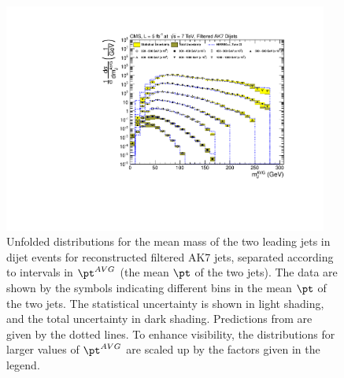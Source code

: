 \begin{figure}[htbp]
\centering
\includegraphics[width=0.95\textwidth]{figs/unfoldedMeasurementDijets_all__Filtered}
\caption{Unfolded distributions for the mean mass of the two leading jets in dijet events for reconstructed filtered AK7 jets,
separated according to intervals in $\pt^{AVG}$ (the mean $\pt$ of the two jets).
The data are shown by the symbols indicating different bins in the mean $\pt$ of the two jets. 
The statistical uncertainty is shown in light shading, and the
total uncertainty in dark shading. 
Predictions
from \HERWIG are given by the dotted lines. 
To enhance visibility, the distributions for larger values of $\pt^{AVG}$ 
are scaled up by the factors given in the legend. 
\label{figs:unfoldedMeasurementDijets_all_Filtered}}
\end{figure}

